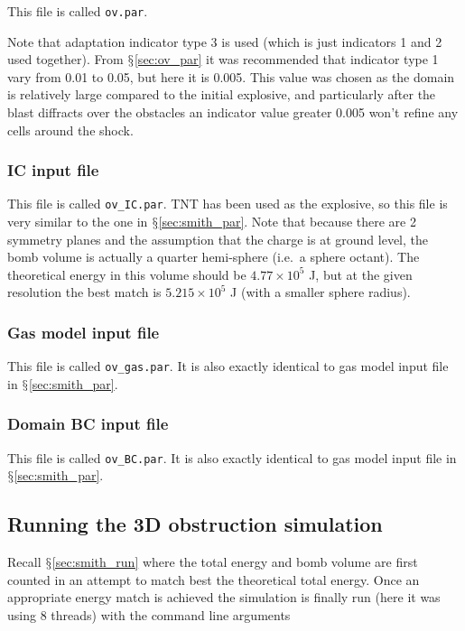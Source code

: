 \documentclass[pdftex, 12pt, a4paper]{report}
\begin{document}
This file is called \verb'ov.par'.

Note that adaptation indicator type 3 is used (which is just indicators 1 and 2 used together).  From 
$\mathsection$\ref{sec:ov_par} it was recommended that indicator type 1 vary from 0.01 to 0.05, but here it is 0.005.  This
value was chosen as the domain is relatively large compared to the initial explosive, and particularly after the blast
diffracts over the obstacles an indicator value greater 0.005 won't refine any cells around the shock.  

\subsubsection{IC input file}

This file is called \verb'ov_IC.par'.
TNT has been used as the explosive, so this file is very similar to the one in $\mathsection$\ref{sec:smith_par}.
Note that because there are 2 symmetry planes and the assumption that the charge is at ground level, the bomb volume is actually
a quarter hemi-sphere (i.e.\ a sphere octant).  The theoretical energy in this volume should be $4.77 \times 10^5$ J, but
at the given resolution the best match is $5.215 \times 10^5$ J (with a smaller sphere radius).

\subsubsection{Gas model input file}

This file is called \verb'ov_gas.par'.  It is also exactly identical to gas model input file in $\mathsection$\ref{sec:smith_par}. 

\subsubsection{Domain BC input file}

This file is called \verb'ov_BC.par'.  It is also exactly identical to gas model input file in $\mathsection$\ref{sec:smith_par}.

\subsection{Running the 3D obstruction simulation}\label{sec:Rigas_run}

Recall $\mathsection$\ref{sec:smith_run} where the total energy and bomb volume are first counted in an attempt to match best the 
theoretical total energy.  Once an appropriate energy match is achieved the simulation is finally run (here it was using 8 threads) with
the command line arguments
\end{document}
